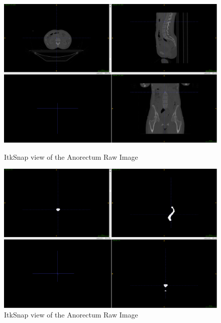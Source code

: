 \documentclass[11pt]{article}
\begin{document}
\begin{figure}[H]
    \centering
    \captionsetup{width=0.45\textwidth}
    \begin{minipage}{.5\textwidth}
        \centering
        \includegraphics[width=\linewidth]{images/AnorectumImage.png}
        \caption{ItkSnap view of the Anorectum Raw Image}\label{fig:AnorectumImage}
    \end{minipage}%
    \begin{minipage}{.5\textwidth}
        \centering
        \includegraphics[width=\linewidth]{images/AnorectumLabel.png}
        \caption{ItkSnap view of the Anorectum Raw Image}\label{fig:AnorectumLabel}
    \end{minipage}%
\end{figure} 
\end{document}

